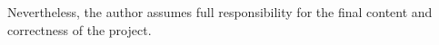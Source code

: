 \documentclass{settings/notex}
\begin{document}
Nevertheless, the author assumes full responsibility for the final content and
correctness of the project.

\pagebreak
\appendix
\renewcommand{\thesection}{\Alph{section}} %
\renewcommand{\thesubsection}{\thesection\arabic{subsection}} %

\end{document}
